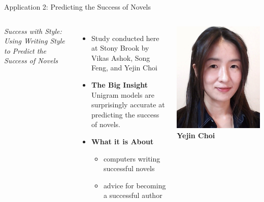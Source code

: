 \documentclass[professionalfonts, xcolor={usenames,svgnames,x11names,table}]{beamer}
\begin{document}
\begin{frame}{Application 2: Predicting the Success of Novels}
    \begin{columns}
        \emph{Success with Style: Using Writing Style to Predict the Success of Novels}
        \begin{itemize}
            \item Study conducted here at Stony Brook by Vikas Ashok, Song Feng, and Yejin Choi
            \item \textbf{The Big Insight}\\
                Unigram models are surprisingly accurate at predicting the success of novels.
            \item \textbf{What it is  About}\\
                \begin{itemize}
                    \item computers writing successful novels
                    \item advice for becoming a successful author
                \end{itemize}
        \end{itemize}

        \centering
        \includegraphics[width=1\linewidth]{./img/yejin_choi}
        \\
        \noindent
        \footnotesize\bfseries Yejin Choi
    \end{columns}
\end{frame}
\end{document}
